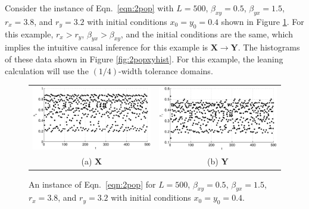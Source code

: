 Consider the instance of Eqn.\ \ref{eqn:2pop} with $L=500$, $\beta_{xy} = 0.5$, $\beta_{yx} = 1.5$, $r_x = 3.8$, and $r_y = 3.2$ with initial conditions $x_0 = y_0 = 0.4$ shown in Figure \ref{fig:2popxyplot}.  For this example, $r_x>r_y$, $\beta_{yx}>\beta_{xy}$, and the initial conditions are the same, which implies the intuitive causal inference for this example is $\mathbf{X}\rightarrow\mathbf{Y}$.  The histograms of these data shown in Figure \ref{fig:2popxyhist}.  For this example, the leaning calculation will use the $(1/4)$-width tolerance domains.
\begin{figure}[ht]
\begin{tabular}{cc}
\includegraphics[scale=0.5]{CoupLogMapExample_X.eps} & \includegraphics[scale=0.5]{CoupLogMapExample_Y.eps} \\
(a) $\mathbf{X}$ & (b) $\mathbf{Y}$
\end{tabular}
\caption{An instance of Eqn.\ \ref{eqn:2pop} for $L=500$, $\beta_{xy} = 0.5$, $\beta_{yx} = 1.5$, $r_x = 3.8$, and $r_y = 3.2$ with initial conditions $x_0 = y_0 = 0.4$.}
\label{fig:2popxyplot}
\end{figure}
